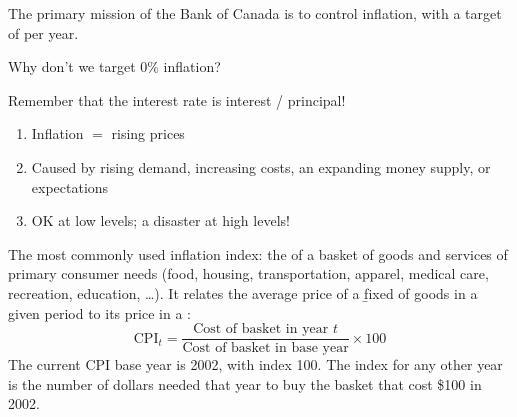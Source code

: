 The primary mission of the Bank of Canada is to control inflation, with a
target of  per year.

\begin{example}
    Why don't we target 0\% inflation?
    \\
\end{example}

\begin{remark}
    Remember that the interest rate is interest / principal!
\end{remark}

\begin{enumerate}
    \item Inflation $=$ rising prices
    \item Caused by rising demand, increasing costs, an expanding money supply, or expectations
    \item OK at low levels; a disaster at high levels!
\end{enumerate}


\begin{definition}
    The most commonly used inflation index: the  of a basket of goods and services of primary consumer needs
    (food, housing, transportation, apparel, medical care, recreation,
    education, \dots). It relates the average price of a \b{fixed}
     of goods in a given period to its price in a :
    \[\boxed{\text{CPI}_t = \frac{\text{Cost of basket in year } t}{\text{Cost of basket in base year}} \times 100}\]
    The current CPI base year is 2002, with index 100. The index for any
    other year is the number of dollars needed that year to buy the basket
    that cost \$100 in 2002.
\end{definition}

